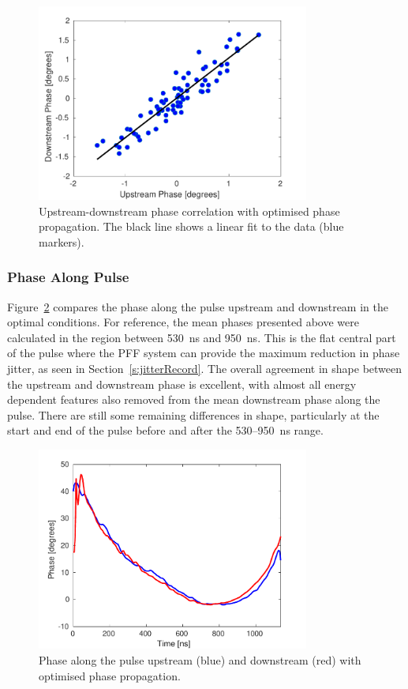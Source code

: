 \begin{figure}
  \centering
  \includegraphics[width=0.8\textwidth]{Figures/propagation/bestProp_meanCorr}
  \caption{Upstream-downstream phase correlation with optimised phase propagation. The black line shows a linear fit to the data (blue markers).}
  \label{f:bestProp_meanCorr}
\end{figure}

\subsubsection{Phase Along Pulse}

Figure~\ref{f:bestProp_meanAlong} compares the phase along the pulse upstream and downstream in the optimal conditions. For reference, the mean phases presented above were calculated in the region between 530~ns and 950~ns. This is the flat central part of the pulse where the PFF system can provide the maximum reduction in phase jitter, as seen in Section~\ref{s:jitterRecord}. The overall agreement in shape between the upstream and downstream phase is excellent, with almost all energy dependent features also removed from the mean downstream phase along the pulse. There are still some remaining differences in shape, particularly at the start and end of the pulse before and after the 530--950~ns range.

\begin{figure}
  \centering
  \includegraphics[width=0.8\textwidth]{Figures/propagation/bestProp_meanAlong}
  \caption{Phase along the pulse upstream (blue) and downstream (red) with optimised phase propagation.}
  \label{f:bestProp_meanAlong}
\end{figure}

